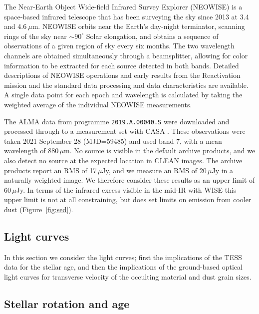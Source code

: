 \documentclass[sn-nature]{sn-jnl}%
\begin{document}
The Near-Earth Object Wide-field Infrared Survey Explorer (NEOWISE) is a space-based infrared telescope that has been surveying the sky since 2013 at $3.4$ and $4.6~\mu$m.
%
NEOWISE orbits near the Earth's day-night terminator, scanning rings of the sky near $\sim90^\circ$ Solar elongation, and obtains a sequence of observations of a given region of sky every six months.
%
The two wavelength channels are obtained simultaneously through a beamsplitter, allowing for color information to be extracted for each source detected in both bands.
%
Detailed descriptions of NEOWISE operations and early results from the Reactivation mission \cite{mainzer14neowise} and the standard data processing and data characteristics \cite{cutri15} are available.
%
A single data point for each epoch and wavelength is calculated by taking the weighted average of the individual NEOWISE measurements.



The ALMA data from programme \texttt{2019.A.00040.S} were downloaded and processed through to a measurement set with CASA \cite{2007ASPC..376..127M}.
%
These observations were taken 2021 September 28 (MJD=59485) and used band 7, with a mean wavelength of 880\,$\mu$m.
%
No source is visible in the default archive products, and we also detect no source at the expected location in CLEAN images.
%
The archive products report an RMS of 17\,$\mu$Jy, and we measure an RMS of 20\,$\mu$Jy in a naturally weighted image.
%
We therefore consider these results as an upper limit of 60\,$\mu$Jy.
%
In terms of the infrared excess visible in the mid-IR with WISE this upper limit is not at all constraining, but does set limits on emission from cooler dust (Figure~\ref{fig:sed}).

\subsection*{Light curves}

In this section we consider the light curves; first the implications of the TESS data for the stellar age, and then the implications of the ground-based optical light curves for transverse velocity of the occulting material and dust grain sizes.

\subsection*{Stellar rotation and age}
\end{document}
